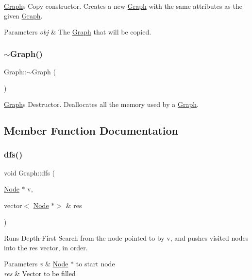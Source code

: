 \hyperlink{class_graph}{Graph}\textquotesingle{}s Copy constructor. Creates a new \hyperlink{class_graph}{Graph} with the same attributes as the given \hyperlink{class_graph}{Graph}.


\begin{DoxyParams}{Parameters}
{\em obj} & The \hyperlink{class_graph}{Graph} that will be copied. \\
\hline
\end{DoxyParams}
\hypertarget{class_graph_a902c5b3eacb66d60752525ab23297a95}{}\label{class_graph_a902c5b3eacb66d60752525ab23297a95} 
\subsubsection{\texorpdfstring{$\sim$\+Graph()}{~Graph()}}
{\footnotesize\ttfamily Graph\+::$\sim$\+Graph (\begin{DoxyParamCaption}{ }\end{DoxyParamCaption})}

\hyperlink{class_graph}{Graph}\textquotesingle{}s Destructor. Deallocates all the memory used by a \hyperlink{class_graph}{Graph}. 

\subsection{Member Function Documentation}
\hypertarget{class_graph_ab596c4b805ecdf622c4f3d952f894a50}{}\label{class_graph_ab596c4b805ecdf622c4f3d952f894a50} 
\subsubsection{\texorpdfstring{dfs()}{dfs()}}
{\footnotesize\ttfamily void Graph\+::dfs (\begin{DoxyParamCaption}\item[{\hyperlink{class_node}{Node} $\ast$}]{v,  }\item[{vector$<$ \hyperlink{class_node}{Node} $\ast$$>$ \&}]{res }\end{DoxyParamCaption})}

Runs Depth-\/\+First Search from the node pointed to by v, and pushes visited nodes into the res vector, in order.


\begin{DoxyParams}{Parameters}
{\em v} & \hyperlink{class_node}{Node} $\ast$ to start node \\
\hline
{\em res} & Vector to be filled \\
\hline
\end{DoxyParams}
\hypertarget{class_graph_a819fb225997f026a192ec5df1b17df84}{}\label{class_graph_a819fb225997f026a192ec5df1b17df84} 
